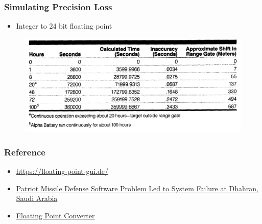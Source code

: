 \documentclass[10pt]{beamer}
\begin{document}
\begin{frame}
    \frametitle{Simulating Precision Loss}
    \begin{itemize}
        \item Integer to 24 bit floating point
    \end{itemize}
    \begin{figure}
        \centering
        \includegraphics[width=1.0\textwidth]{patriot.png}
    \end{figure}
\end{frame}
\begin{frame}
    \frametitle{Reference}
    
    
    \cite{Goldberg_1991}
    \cite{8766229}
    \begin{itemize}
        \item \color{cyan}\href{https://floating-point-gui.de/}{https://floating-point-gui.de/}
        \item \href{https://www.gao.gov/products/imtec-92-26}{Patriot Missile Defense Software Problem Led to System Failure at Dhahran, Saudi Arabia}
        \item \href{https://www.h-schmidt.net/FloatConverter/IEEE754.html}{Floating Point Converter}
    \end{itemize}
\end{frame}
\end{document}
